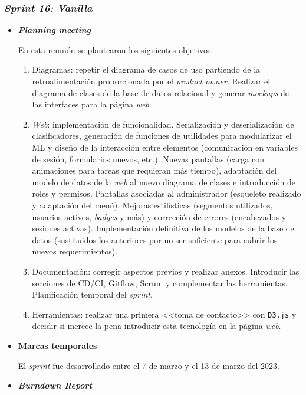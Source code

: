 \subsubsection{\textit{Sprint 16: Vanilla}}
\begin{itemize}
	
	\item \textbf{\textit{Planning meeting}}
	
	En esta reunión se plantearon los siguientes objetivos:
	\begin{enumerate}
		\item Diagramas: repetir el diagrama de casos de uso partiendo de la retroalimentación proporcionada por el \textit{product owner}. Realizar el diagrama de clases de la base de datos relacional y generar \textit{mockups} de las interfaces para la página \textit{web}.
		\item \textit{Web}: implementación de funcionalidad. Serialización y deserialización de clasificadores, generación de funciones de utilidades para modularizar el ML y diseño de la interacción entre elementos (comunicación en variables de sesión, formularios nuevos, etc.). Nuevas pantallas (carga con animaciones para tareas que requieran más tiempo), adaptación del modelo de datos de la \textit{web} al nuevo diagrama de clases e introducción de roles y permisos. Pantallas asociadas al administrador (esqueleto realizado y adaptación del menú). Mejoras estilísticas (segmentos utilizados, usuarios activos, \textit{badges} y más) y corrección de errores (encabezados y sesiones activas). Implementación definitiva de los modelos de la base de datos (sustituidos los anteriores por no ser suficiente para cubrir los nuevos requerimientos).
		\item Documentación: corregir aspectos previos y realizar anexos. Introducir las secciones de CD/CI, Gitflow, Scrum y complementar las herramientas. Planificación temporal del \textit{sprint}.
		\item Herramientas: realizar una primera <<toma de contacto>> con \texttt{D3.js} y decidir si merece la pena introducir esta tecnología en la página \textit{web}.
		
	\end{enumerate}
	\item \textbf{Marcas temporales}
	
	El \textit{sprint} fue desarrollado entre el 7 de marzo y el 13 de marzo del 2023.
			
	\item \textbf{\textit{Burndown Report}}
	

\end{itemize}
